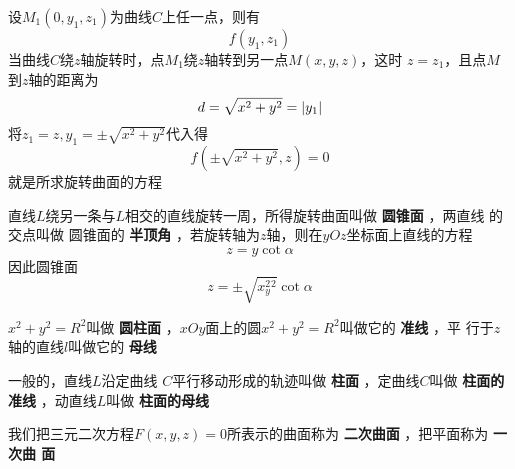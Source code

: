 \documentclass[11pt]{article}
\begin{document}
设\(M_1(0,y_1,z_1)\)为曲线\(C\)上任一点，则有
\begin{equation*}
f(y_1,z_1)
\end{equation*}
当曲线\(C\)绕\(z\)轴旋转时，点\(M_1\)绕\(z\)轴转到另一点\(M(x,y,z)\)，这时
\(z=z_1\)，且点\(M\)到\(z\)轴的距离为
\begin{equation*}
d=\sqrt{x^2+y^2}=\abs{y_1}
\end{equation*}
将\(z_1=z,y_1=\pm\sqrt{x^2+y^2}\)代入得
\begin{equation*}
f(\pm\sqrt{x^2+y^2},z)=0
\end{equation*}
就是所求旋转曲面的方程

\begin{examplle}[]
直线\(L\)绕另一条与\(L\)相交的直线旋转一周，所得旋转曲面叫做 \textbf{圆锥面} ，两直线
的交点叫做 圆锥面的 \textbf{半顶角} ，若旋转轴为\(z\)轴，则在\(yOz\)坐标面上直线的方程
\begin{equation*}
z=y\cot\alpha
\end{equation*}
因此圆锥面
\begin{equation*}
z=\pm\sqrt{x^2_y^2}\cot\alpha
\end{equation*}
\end{examplle}

\(x^2+y^2=R^2\)叫做 \textbf{圆柱面} ，\(xOy\)面上的圆\(x^2+y^2=R^2\)叫做它的 \textbf{准线} ，平
行于\(z\)轴的直线\(l\)叫做它的 \textbf{母线}

一般的，直线\(L\)沿定曲线 \(C\)平行移动形成的轨迹叫做 \textbf{柱面} ，定曲线\(C\)叫做
\textbf{柱面的准线} ，动直线\(L\)叫做 \textbf{柱面的母线}

我们把三元二次方程\(F(x,y,z)=0\)所表示的曲面称为 \textbf{二次曲面} ，把平面称为 \textbf{一次曲
面}
\end{document}
